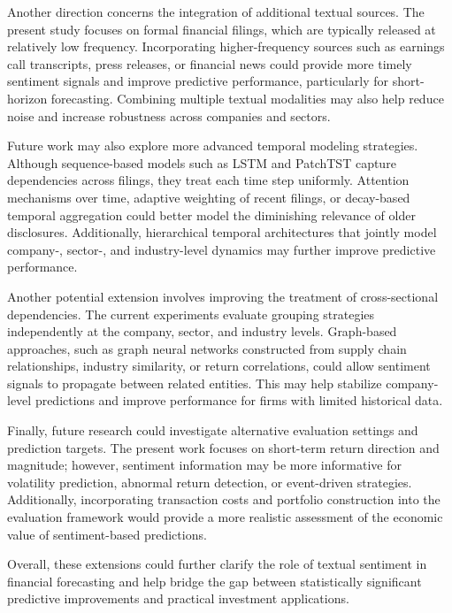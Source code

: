 Another direction concerns the integration of additional textual sources. The present study focuses on formal financial filings, which are typically released at relatively low frequency. Incorporating higher-frequency sources such as earnings call transcripts, press releases, or financial news could provide more timely sentiment signals and improve predictive performance, particularly for short-horizon forecasting. Combining multiple textual modalities may also help reduce noise and increase robustness across companies and sectors.

Future work may also explore more advanced temporal modeling strategies. Although sequence-based models such as LSTM and PatchTST capture dependencies across filings, they treat each time step uniformly. Attention mechanisms over time, adaptive weighting of recent filings, or decay-based temporal aggregation could better model the diminishing relevance of older disclosures. Additionally, hierarchical temporal architectures that jointly model company-, sector-, and industry-level dynamics may further improve predictive performance.

Another potential extension involves improving the treatment of cross-sectional dependencies. The current experiments evaluate grouping strategies independently at the company, sector, and industry levels. Graph-based approaches, such as graph neural networks constructed from supply chain relationships, industry similarity, or return correlations, could allow sentiment signals to propagate between related entities. This may help stabilize company-level predictions and improve performance for firms with limited historical data.

Finally, future research could investigate alternative evaluation settings and prediction targets. The present work focuses on short-term return direction and magnitude; however, sentiment information may be more informative for volatility prediction, abnormal return detection, or event-driven strategies. Additionally, incorporating transaction costs and portfolio construction into the evaluation framework would provide a more realistic assessment of the economic value of sentiment-based predictions.

Overall, these extensions could further clarify the role of textual sentiment in financial forecasting and help bridge the gap between statistically significant predictive improvements and practical investment applications.